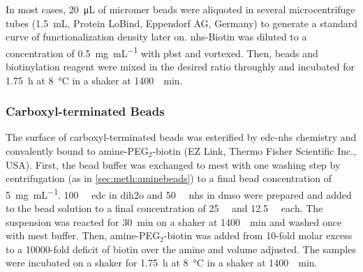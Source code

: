 In most cases, \SI{20}{\micro\liter} of micromer beads were aliquoted in several microcentrifuge tubes (\SI{1.5}{\milli\liter}, Protein LoBind, Eppendorf AG, Germany) to generate a standard curve of functionalization density later on. \gls{nhs}-Biotin was diluted to a concentration of \SI{0.5}{\milli\gram\per\milli\liter} with \gls{pbst} and vortexed. Then, beads and biotinylation reagent were mixed in the desired ratio throughly and incubated for \SI{1.75}{\hour} at \SI{8}{\degreeCelsius} in a shaker at \SI{1400}{\per\minute}.
\subsubsection{Carboxyl-terminated Beads}
The surface of \gls{carboxyl}-terminated beads was esterified by \gls{edc}-\gls{nhs} chemistry and convalently bound to amine-PEG$_\mathrm{2}$-biotin (EZ Link, Thermo Fisher Scientific Inc., USA). First, the bead buffer was exchanged to \gls{mest} with one washing step by centrifugation (as in \ref{sec:meth:aminebeads}) to a final bead concentration of \SI{5}{\milli\gram\per\milli\liter}. \SI{100}{\milli\molar} \gls{edc} in \gls{dih2o} and \SI{50}{\milli\molar} \gls{nhs} in \gls{dmso} were prepared and added to the bead solution to a final concentration of \SI{25}{\milli\molar} and \SI{12.5}{\milli\molar} each. The suspension was reacted for \SI{30}{\minute} on a shaker at \SI{1400}{\per\minute} and washed once with \gls{mest} buffer. Then,  amine-PEG$_\mathrm{2}$-biotin was added from 10-fold molar excess to a \num{10000}-fold deficit of biotin over the amine and volume adjusted. The samples were incubated on a shaker for \SI{1.75}{\hour} at \SI{8}{\degreeCelsius} in a shaker at \SI{1400}{\per\minute}.
